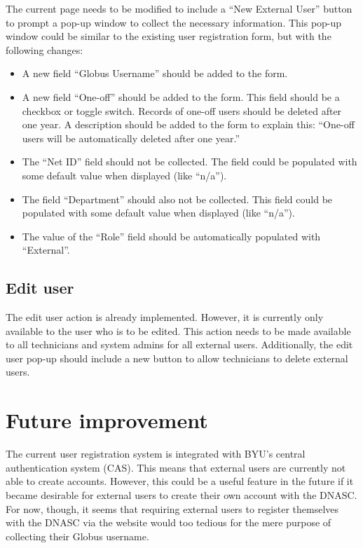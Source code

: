 The current page needs to be modified to include a ``New External User'' button to
prompt a pop-up window to collect the necessary information. This pop-up window
could be similar to the existing user registration form, but with the following
changes:
\begin{itemize}\itemsep1pt
    \item A new field ``Globus Username'' should be added to the form.
    \item A new field ``One-off'' should be added to the form. This field should be
    a checkbox or toggle switch. Records of one-off users should be deleted after 
    one year. A description should be added to the form to explain this:
    ``One-off users will be automatically deleted after one year.''
    \item The ``Net ID'' field should not be collected. The field could be populated 
    with some default value when displayed (like ``n/a'').
    \item The field ``Department'' should also not be collected. This field could be
    populated with some default value when displayed (like ``n/a'').
    \item The value of the ``Role'' field should be automatically populated with 
    ``External''.
\end{itemize}

\subsection{Edit user}

The edit user action is already implemented. However, it is currently only available
to the user who is to be edited. This action needs to be made available to all 
technicians and system admins for all external users. Additionally, the edit user
pop-up should include a new button to allow technicians to delete external users.

\section{Future improvement}
The current user registration system is integrated with BYU's central 
authentication system (CAS). This means that external users are currently not 
able to create accounts. However, this could be a useful feature in the future 
if it became desirable for external users to create their own account with the DNASC.
For now, though, it seems that requiring external users to register themselves with 
the DNASC via the website would too tedious for the mere purpose of collecting their
Globus username.

